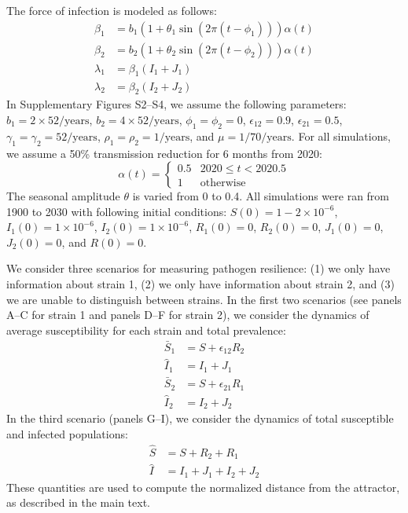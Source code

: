 \documentclass[12pt]{article}
\begin{document}
The force of infection is modeled as follows:
\begin{align}
\beta_1 &= b_1 (1 + \theta_1 \sin(2 \pi (t-\phi_1))) \alpha(t)\\
\beta_2 &= b_2 (1 + \theta_2 \sin(2 \pi (t-\phi_2))) \alpha(t)\\
\lambda_1 &= \beta_1 (I_1 + J_1)\\
\lambda_2 &= \beta_2 (I_2 + J_2)
\end{align}
In Supplementary Figures S2--S4, we assume the following parameters:
$b_1 = 2 \times 52/\mathrm{years}$, $b_2 = 4 \times 52/\mathrm{years}$, $\phi_1 = \phi_2 = 0$, $\epsilon_{12} = 0.9$, $\epsilon_{21} = 0.5$,
$\gamma_1 = \gamma_2 = 52/\mathrm{years}$, $\rho_1 = \rho_2 = 1/\mathrm{years}$, and $\mu=1/70/\mathrm{years}$.
For all simulations, we assume a 50\% transmission reduction for 6 months from 2020:
\begin{equation}
\alpha(t) = \begin{cases}
0.5 & 2020 \leq t< 2020.5\\
1 & \textrm{otherwise}
\end{cases}
\end{equation}
The seasonal amplitude $\theta$ is varied from 0 to 0.4.
All simulations were ran from 1900 to 2030 with following initial conditions: 
$S(0) = 1 - 2\times 10^{-6}$, $I_1(0) = 1 \times 10^{-6}$, $I_2(0) = 1 \times 10^{-6}$, $R_1(0) = 0$, $R_2(0) = 0$, $J_1(0) = 0$, $J_2(0) = 0$, and $R(0) = 0$.

We consider three scenarios for measuring pathogen resilience: (1) we only have information about strain 1, (2) we only have information about strain 2, and (3) we are unable to distinguish between strains.
In the first two scenarios (see panels A--C for strain 1 and panels D--F for strain 2), we consider the dynamics of average susceptibility for each strain and total prevalence:
\begin{align}
\bar{S}_1 &= S + \epsilon_{12} R_2\\
\hat{I}_1 &= I_1 + J_1\\
\bar{S}_2 &= S + \epsilon_{21} R_1\\
\hat{I}_2 &= I_2 + J_2
\end{align}
In the third scenario (panels G--I), we consider the dynamics of total susceptible and infected populations:
\begin{align}
\hat{S} &= S + R_2 + R_1\\
\hat{I} &= I_1 + J_1 + I_2 + J_2
\end{align}
These quantities are used to compute the normalized distance from the attractor, as described in the main text.
\end{document}
